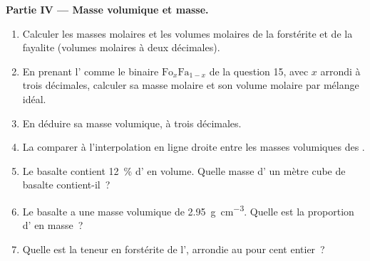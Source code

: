 \begin{problem}
\medskip
\noindent\textbf{Partie IV --- Masse volumique et masse.}
\begin{enumerate}[resume]
  \item Calculer les masses molaires et les volumes molaires de la forstérite et
        de la fayalite (volumes molaires à deux décimales).
  \item En prenant l' comme le binaire $\mathrm{Fo}_x\mathrm{Fa}_{1-x}$ de
        la question 15, avec $x$ arrondi à trois décimales, calculer sa masse
        molaire et son volume molaire par mélange idéal.
  \item En déduire sa masse volumique, à trois décimales.
  \item La comparer à l'interpolation en ligne droite entre les masses volumiques
        des .
  \item Le basalte contient \qty{12}{\percent} d' en volume. Quelle masse
        d' un mètre cube de basalte contient-il~?
  \item Le basalte a une masse volumique de \qty{2.95}{g.cm^{-3}}. Quelle est la
        proportion d' en masse~?
  \item Quelle est la teneur en forstérite de l', arrondie au pour cent
        entier~?
\end{enumerate}
\end{problem}
